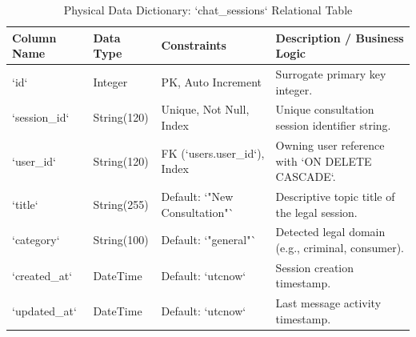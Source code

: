 \begin{table}[H]
\caption{Physical Data Dictionary: `chat_sessions` Relational Table}
\label{tab:schema_sessions}
\centering
\small
\begin{tabularx}{\textwidth}{lp{2.8cm}p{2.5cm}X}
\toprule
\textbf{Column Name} & \textbf{Data Type} & \textbf{Constraints} & \textbf{Description / Business Logic} \\
\midrule
`id` & Integer & PK, Auto Increment & Surrogate primary key integer. \\
`session_id` & String(120) & Unique, Not Null, Index & Unique consultation session identifier string. \\
`user_id` & String(120) & FK (`users.user_id`), Index & Owning user reference with `ON DELETE CASCADE`. \\
`title` & String(255) & Default: `"New Consultation"` & Descriptive topic title of the legal session. \\
`category` & String(100) & Default: `"general"` & Detected legal domain (e.g., criminal, consumer). \\
`created_at` & DateTime & Default: `utcnow` & Session creation timestamp. \\
`updated_at` & DateTime & Default: `utcnow` & Last message activity timestamp. \\
\bottomrule
\end{tabularx}
\end{table}

